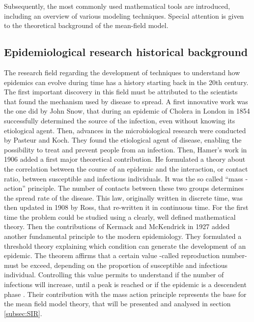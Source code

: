 Subsequently, the most commonly used mathematical tools are introduced, including an overview of various modeling techniques. Special attention is given to the theoretical background of the mean-field model.

\subsection{Epidemiological research historical background}
\label{subsec:history}

The research field regarding the development of techniques to understand how epidemics can evolve during time has a history starting back in the 20th century. The first important discovery in this field must be attributed to the scientists that found the mechanism used by disease to spread. 
A first innovative work was the one did by John Snow, that during an epidemic of Cholera in London in 1854 successfully determined the source of the infection, even without knowing its etiological agent. Then, advances in the microbiological research were conducted by Pasteur and Koch. They found the etiological agent of disease, enabling the possibility to treat and prevent people from an infection. 
Then, Hamer's work in 1906 added a first major theoretical contribution. He formulated a theory about the correlation between the course of an epidemic and the interaction, or contact ratio, between susceptible and infectious individuals. It was the so called “mass -action” principle. The number of contacts between these two groups determines the spread rate of the disease. 
This law, originally written in discrete time, was then updated in 1908 by Ross, that re-written it  in continuous time. For the first time the problem could be studied using a clearly, well defined mathematical theory. Then the contributions of Kermack and McKendrick in 1927 added another fundamental principle to the modern epidemiology. They formulated a threshold theory explaining which condition can generate the development of an epidemic. The theorem affirms that a certain value -called reproduction number- must be exceed, depending on the proportion of susceptible and infectious individual. Controlling this value permits to understand if the number of infections will increase, until a peak is reached or if the epidemic is a descendent phase \cite{Mata2021, Anderson_82}. 
Their contribution with the mass action principle represents the base for the mean field model theory, that will be presented and analysed in section \ref{subsec:SIR}. 



